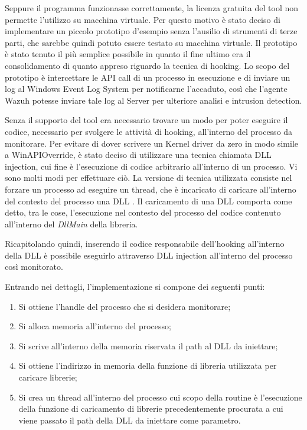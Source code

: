 Seppure il programma funzionasse correttamente, la licenza gratuita del tool non permette l'utilizzo su macchina virtuale. Per questo motivo è stato deciso di implementare un piccolo prototipo d'esempio senza l'ausilio di strumenti di terze parti, che sarebbe quindi potuto essere testato su macchina virtuale. Il prototipo è stato tenuto il più semplice possibile in quanto il fine ultimo era il consolidamento di quanto appreso riguardo la tecnica di hooking.
Lo scopo del prototipo è intercettare le API call di un  processo in esecuzione e di inviare un log al Windows Event Log System per notificarne l'accaduto, così che l'agente Wazuh potesse inviare tale log al Server per ulteriore analisi e intrusion detection.

\medskip
Senza il supporto del tool era necessario trovare un modo per poter eseguire il codice, necessario per svolgere le attività di hooking, all'interno del processo da monitorare. Per evitare di dover scrivere un Kernel driver da zero in modo simile a  WinAPIOverride, è stato deciso di utilizzare una tecnica chiamata DLL injection, cui fine è l'esecuzione di codice arbitrario all'interno di un processo. Vi sono molti modi per effettuare ciò.
La versione di tecnica utilizzata consiste nel forzare un processo ad eseguire un thread, che è incaricato di caricare  all'interno del contesto del processo una DLL \cite{dllinjection}. Il caricamento di una DLL comporta come detto, tra le cose, l'esecuzione nel contesto del processo del codice contenuto all'interno del \textit{DllMain} della libreria. 

Ricapitolando quindi, inserendo  il codice responsabile dell'hooking all'interno della DLL è possibile eseguirlo attraverso DLL injection all'interno del processo così monitorato.

Entrando nei dettagli, l'implementazione si compone dei seguenti punti:
\begin{enumerate}
    \item Si ottiene l'handle del processo che si desidera monitorare;
    \item Si alloca memoria all'interno del processo;
    \item Si scrive all'interno della memoria riservata  il path al DLL da iniettare;
    \item Si ottiene l'indirizzo in memoria della funzione di libreria utilizzata per caricare librerie;
    \item Si crea un thread all'interno del processo cui scopo della routine è l'esecuzione della funzione di caricamento di librerie precedentemente procurata a cui viene passato il path della DLL da iniettare come parametro.
\end{enumerate}

